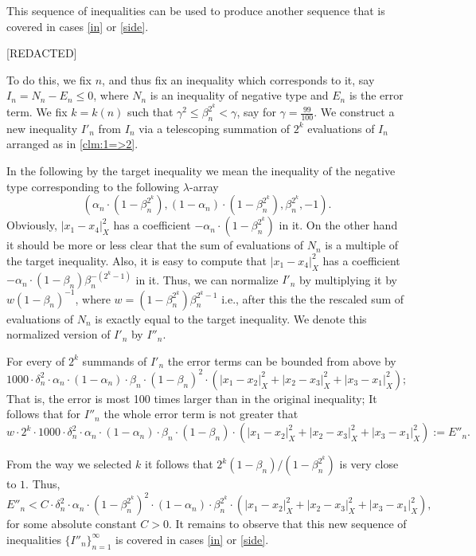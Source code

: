 \documentclass[a4paper,10pt]{article}
\begin{document}
This sequence of inequalities can be used to produce another sequence that is covered in cases \ref{in} or \ref{side}. 

[REDACTED]

To do this, we fix $n$, and thus fix an inequality which corresponds to it, say $I_n = N_n - E_n \le 0$, where $N_n$ is an inequality of negative type and $E_n$ is the error term. We fix $k = k(n)$ such that $\gamma^2\le \beta_n^{2^k}<\gamma$, say for $\gamma=\tfrac{99}{100}$.
We construct a new inequality $I'_n$ from $I_n$
via a telescoping summation of $2^k$ evaluations of $I_n$
arranged as in \ref{clm:1=>2}.

In the following by the target inequality we mean the inequality of the negative type corresponding to the following $\lambda$-array 
\[(\alpha_n\cdot(1-\beta_n^{2^k}),(1-\alpha_n)\cdot(1-\beta_n^{2^k}),\beta_n^{2^k},-1).\] 
Obviously, $|x_1-x_4|_X^2$ has a coefficient $-\alpha_n\cdot(1-\beta_n^{2^k})$ in it. On the other hand it should be more or less clear that the sum of evaluations of $N_n$ is a multiple of the target inequality. Also, it is easy to compute that $|x_1-x_4|_X^2$ has a coefficient $-\alpha_n\cdot(1-\beta_n)\beta_n^{-(2^k - 1)}$ in it. Thus, we can normalize $I'_n$ by multiplying it by $w(1-\beta_n)^{-1}$, where $w = (1-\beta_n^{2^k})\beta_n^{2^k - 1}$ i.e., after this the  the rescaled sum of evaluations of $N_n$ is exactly equal to the target inequality. We denote this normalized version of $I'_n$ by $I''_n$.


For every of $2^k$ summands of $I'_n$ the error terms can be bounded from above by
\[1000\cdot\delta_n^2\cdot\alpha_n\cdot(1-\alpha_n)\cdot\beta_n\cdot(1-\beta_n)^2 \cdot (|x_1-x_2|_X^2+|x_2-x_3|_X^2+|x_3-x_1|_X^2);\]
That is, the error is most 100 times larger than in the original inequality; It follows that for $I''_n$ the whole error term is not greater that 
\[w \cdot 2^k\cdot1000\cdot\delta_n^2\cdot\alpha_n\cdot(1-\alpha_n)\cdot\beta_n\cdot(1-\beta_n) \cdot (|x_1-x_2|_X^2+|x_2-x_3|_X^2+|x_3-x_1|_X^2) := E''_n.\]

From the way we selected $k$ it follows that 
 $2^{k}(1 - \beta_n) / (1 - \beta_n^{2^k})$ is very close to $1$. Thus, 
\[ E''_n
<
C \cdot \delta_n^2\cdot \alpha_n\cdot(1-\beta_n^{2^k})^2\cdot(1-\alpha_n)\cdot\beta_n^{2^k} \cdot (|x_1-x_2|_X^2+|x_2-x_3|_X^2+|x_3-x_1|_X^2),
\]
for some absolute constant $C > 0$.
It remains to observe that this new sequence of inequalities $\{{I''_n}\}_{n=1}^{\infty}$ is covered in cases \ref{in} or \ref{side}.
\qeds
\end{document}
